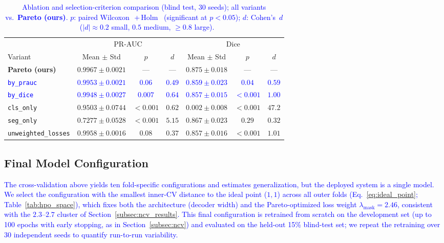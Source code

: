 \documentclass[final,5p,times,twocolumn,number]{elsarticle}
\newcommand{\rev}[1]{\textcolor{blue}{#1}}
\begin{document}
\begin{table}[!t]
  \centering
  \caption{\rev{Ablation and selection-criterion comparison (blind test,
           30 seeds); all variants vs.\ \textbf{Pareto (ours)}. $p$: paired
           Wilcoxon~\citep{wilcoxon1945}\,+\,Holm~\citep{holm1979} (significant
           at $p<0.05$); $d$: Cohen's~$d$~\citep{cohen1988statistical}
           ($|d|\!\approx\!0.2$ small, $0.5$ medium, $\geq\!0.8$ large).}}
  \label{tab:ablation}
  \begin{tabular}{lcccccc}
    \toprule
    & \multicolumn{3}{c}{PR-AUC} & \multicolumn{3}{c}{Dice} \\
    \cmidrule(r){2-4}\cmidrule(l){5-7}
    Variant & Mean $\pm$ Std & $p$ & $d$ & Mean $\pm$ Std & $p$ & $d$ \\
    \midrule
    \textbf{Pareto (ours)} & $\mathbf{0.9967 \pm 0.0021}$ & — & — & $\mathbf{0.875 \pm 0.018}$ & — & — \\
    \rev{\texttt{by\_prauc}} & \rev{$0.9953 \pm 0.0021$} & \rev{$0.06$} & \rev{$0.49$} & \rev{$0.859 \pm 0.023$} & \rev{$0.04$} & \rev{$0.59$} \\
    \rev{\texttt{by\_dice}}  & \rev{$0.9948 \pm 0.0027$} & \rev{$0.007$} & \rev{$0.64$} & \rev{$0.857 \pm 0.015$} & \rev{$<0.001$} & \rev{$1.00$} \\
    \midrule
    \texttt{cls\_only}          & $0.9503 \pm 0.0744$ & $<0.001$ & $0.62$ & $0.002 \pm 0.008$ & $<0.001$ & $47.2$ \\
    \texttt{seg\_only}          & $0.7277 \pm 0.0528$ & $<0.001$ & $5.15$ & $0.867 \pm 0.023$ & $0.29$ & $0.32$ \\
    \texttt{unweighted\_losses} & $0.9958 \pm 0.0016$ & $0.08$ & $0.37$ & $0.857 \pm 0.016$ & $<0.001$ & $1.01$ \\
    \bottomrule
  \end{tabular}
\end{table}

\subsection{Final Model Configuration}
\label{subsec:final_config}

\rev{The cross-validation above yields ten fold-specific configurations and
estimates generalization, but the deployed system is a single model. We select
the configuration with the smallest inner-CV distance to the ideal point
($1,1$) across all outer folds (Eq.~\ref{eq:ideal_point};
Table~\ref{tab:hpo_space}), which fixes both
the architecture (decoder width) and the Pareto-optimized loss weight
$\lambda_{\text{mask}}=2.46$, consistent with the $2.3$--$2.7$ cluster of
Section~\ref{subsec:ncv_results}. This final configuration is retrained from
scratch on the development set (up to 100 epochs with early stopping, as in
Section~\ref{subsec:ncv}) and evaluated on the held-out 15\% blind-test
set; we repeat the retraining over 30 independent seeds to quantify
run-to-run variability.}
\end{document}
